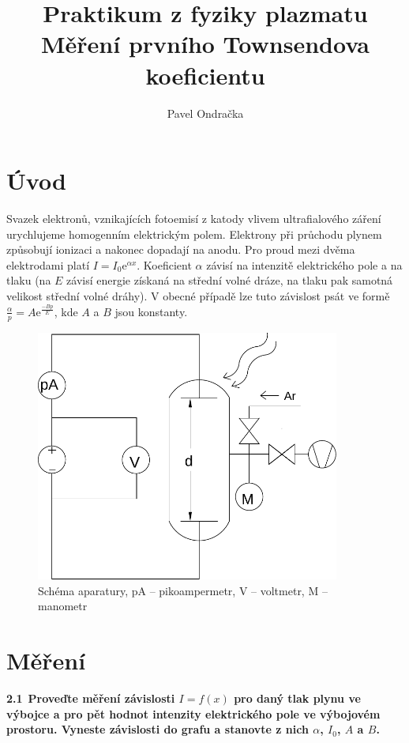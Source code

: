 \documentclass[12pt]{article}
\begin{document}
\title{Praktikum z fyziky plazmatu \\
Měření prvního Townsendova koeficientu}
\author{Pavel Ondračka}
\maketitle

\section{Úvod}
Svazek elektronů, vznikajících fotoemisí z katody vlivem ultrafialového záření urychlujeme homogenním elektrickým polem. Elektrony při průchodu plynem způsobují ionizaci a nakonec dopadají na anodu. Pro proud mezi dvěma elektrodami platí $I=I_0 \mathrm{e}^{\alpha x}$.
Koeficient $\alpha$ závisí na intenzitě elektrického pole a na tlaku (na $E$ závisí energie získaná na střední volné dráze, na tlaku pak samotná velikost střední volné dráhy).
V obecné případě lze tuto závislost psát ve formě $\frac{\alpha}{p} = A \mathrm{e}^{\frac{-B p}{E}}$,
kde $A$ a $B$ jsou konstanty.

\begin{figure}[htbp]
\begin{center}
\includegraphics[width=10cm]{nakres.pdf}
\caption{Schéma aparatury, pA -- pikoampermetr, V -- voltmetr, M -- manometr}
\label{schema}
\end{center}
\end{figure}

\section{Měření}
\begin{boldmath}
\large{\bf{2.1\,\,\,Proveďte měření závislosti  $I=f(x)$  pro daný tlak plynu ve výbojce a pro pět hodnot intenzity elektrického pole ve výbojovém prostoru. Vyneste závislosti do grafu a stanovte z nich $\alpha$, $I_0$, $A$ a $B$.}}\\
\end{boldmath}
\end{document}
